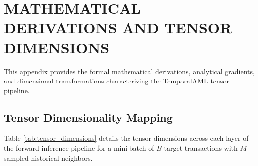 \chapter{MATHEMATICAL DERIVATIONS AND TENSOR DIMENSIONS}
\label{AppendixA}

This appendix provides the formal mathematical derivations, analytical gradients, and dimensional transformations characterizing the TemporalAML tensor pipeline.

\section{Tensor Dimensionality Mapping}
Table \ref{tab:tensor_dimensions} details the tensor dimensions across each layer of the forward inference pipeline for a mini-batch of $B$ target transactions with $M$ sampled historical neighbors.

